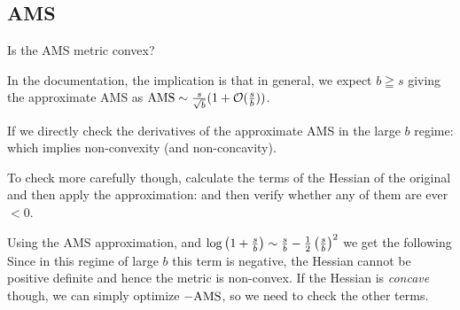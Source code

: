 
\begin{appendices}
\section{AMS}
Is the AMS metric convex?

In the documentation, the implication is that in general, we expect $b \geqq s$ giving the approximate AMS as $\rm{AMS} \sim \frac{s}{\sqrt{b}}(1+\mc{O}(\frac{s}{b}))$.

If we directly check the derivatives of the approximate AMS in the large $b$ regime:
which implies non-convexity (and non-concavity).

To check more carefully though, calculate the terms of the Hessian of the original and then apply the approximation:
and then verify whether any of them are ever $<0$.

Using the AMS approximation, and $\log\left(1+\frac{s}{b}\right) \sim \frac{s}{b} - \half\left(\frac{s}{b}\right)^2$ we get the following
Since in this regime of large $b$ this term is negative, the Hessian cannot be positive definite and hence the metric is non-convex. If the Hessian is \emph{concave} though, we can simply optimize $-\rm{AMS}$, so we need to check the other terms.



\end{appendices}
